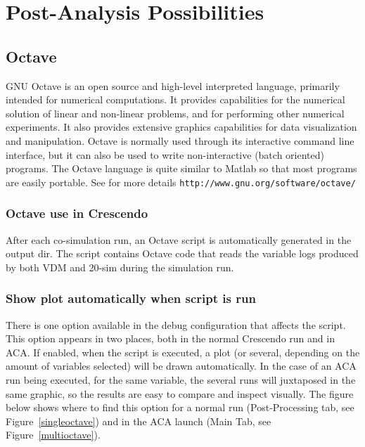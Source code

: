 \documentclass{crescendorepchap}
\newcommand{\url}[1]{\texttt{#1}}
\begin{document}
\chapter{Post-Analysis Possibilities}\label{chap:postana}

\section{Octave}

GNU Octave is an open source and high-level interpreted language, primarily intended for
numerical computations. It provides capabilities for the numerical
solution of linear and non-linear problems, and for performing other
numerical experiments. It also provides extensive graphics capabilities
for data visualization and manipulation. Octave is normally used through
its interactive command line interface, but it can also be used to write
non-interactive (batch oriented) programs. The Octave language is quite similar to Matlab
so that most programs are easily portable. See for more details
\url{http://www.gnu.org/software/octave/}



\subsection{Octave use in Crescendo}

After each co-simulation run, an Octave script is automatically generated in the
output dir. The script contains Octave code that reads the variable logs
produced by both VDM and 20-sim during the simulation run.

\subsection{Show plot automatically when script is run}

There is one option available in the debug configuration that affects
the script. This option appears in two places, both in the normal Crescendo
run and in ACA. If enabled, when the script is executed, a plot (or
several, depending on the amount of variables selected) will be drawn
automatically. In the case of an ACA run being executed, for
the same variable, the several runs will juxtaposed in the same graphic, so
the results are easy to compare and inspect visually. The figure
below shows where to find this option for a normal run
(Post-Processing tab, see Figure~\ref{singleoctave})
and in the ACA launch (Main Tab, see Figure~\ref{multioctave}).
\end{document}
